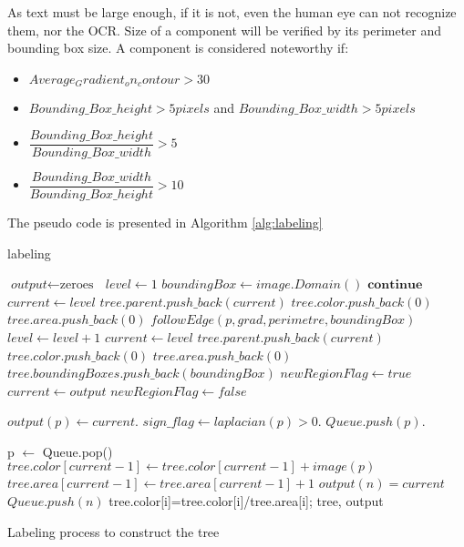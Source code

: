 \par 
As text must be large enough, if it is not, even the human eye can not recognize them, nor the OCR. Size of a component will be verified by its perimeter and bounding box size. A component is considered noteworthy if:
\begin{itemize} 
	\item $Average_Gradient_on_contour > 30$
	\item $Bounding\_Box\_height >5 pixels $ and $Bounding\_Box\_width>5 pixels $
	\item $\dfrac{Bounding\_Box\_height}{Bounding\_Box\_width} >5 $  
	\item $\dfrac{Bounding\_Box\_width}{Bounding\_Box\_height} >10 $	
\end{itemize}
\par
The pseudo code is presented in Algorithm \ref{alg:labeling}

\begin{algorithm}
\caption{labeling}\label{alg:labeling}
\begin{algorithmic}[1]
\State $\textit{output} \gets \text{zeroes }$
\State $ level \gets 1$
\State $ boundingBox \gets image.Domain()$
 $\textbf{continue}$
\EndIf
{}
	\State $current \gets level$
	\State $tree.parent.push\_back(current)$
	\State $tree.color.push\_back(0)$
	\State $tree.area.push\_back(0)$
\Else
	\State $followEdge(p,grad,perimetre,boundingBox)$
		\State $ level \gets level+1$
		\State $ current \gets level$
		\State $tree.parent.push\_back(current)$
		\State $tree.color.push\_back(0)$
		\State $tree.area.push\_back(0)$
		\State $tree.boundingBoxes.push\_back(boundingBox)$		
		\State $newRegionFlag \gets true$		
	\Else
		\State $current \gets output$
		\State $newRegionFlag \gets false$
	\EndIf
\EndIf

\State $output(p) \gets current $.
\State $sign\_flag \gets laplacian(p)>0$.
\State $Queue.push(p)$.

	\State p $\gets$ Queue.pop()
	\State $tree.color[current-1] \gets tree.color[current-1] + image(p) $
	\State $tree.area[current-1] \gets tree.area[current-1] + 1$
			\State $output(n) = current$
			\State $Queue.push(n)$
		\EndIf			
	\EndFor
\EndWhile
\EndFor
{}
	\State tree.color[i]=tree.color[i]/tree.area[i];
\EndFor
\State \Return tree, output
\EndProcedure
\end{algorithmic}
\caption{Labeling process to construct the tree}
\end{algorithm}

